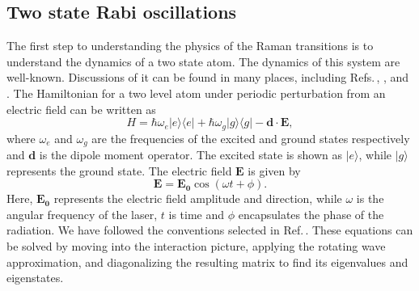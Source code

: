 \subsection{Two state Rabi oscillations}
\label{twoStateSection}
The first step to understanding the physics of the Raman transitions is to understand the dynamics of a two state atom. The dynamics of this system are well-known. Discussions of it can be found in many places, including Refs.\,\cite{cohenTannoudji}, \cite{demilleBudkerKimball}, and \cite{Young1997363}. The Hamiltonian for a two level atom under periodic perturbation from an electric field can be written as 
\begin{equation}
H = \hbar \omega_e |e\rangle\langle e| + \hbar \omega_g |g\rangle\langle g| - \mathbf{d}\cdot\mathbf{E},
\end{equation} 
where $\omega_e$ and $\omega_g$ are the frequencies of the excited and ground states respectively and $\mathbf{d}$ is the dipole moment operator. The excited state is shown as $|e\rangle$, while $|g\rangle$ represents the ground state. The electric field $\mathbf{E}$ is given by 
\begin{equation}
\mathbf{E} = \mathbf{E_0} \cos (\omega t + \phi).
\end{equation}
Here, $\mathbf{E_0}$ represents the electric field amplitude and direction, while $\omega$ is the angular frequency of the laser, $t$ is time and $\phi$ encapsulates the phase of the radiation.
We have followed the conventions selected in Ref.\,\cite{Young1997363}. 
These equations can be solved by moving into the interaction picture, applying the rotating wave approximation, and diagonalizing the resulting matrix to find its eigenvalues and eigenstates.

